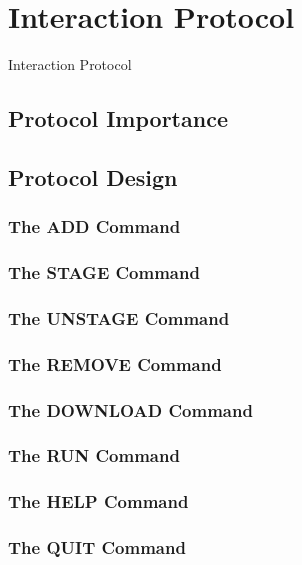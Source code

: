 \chapter{Interaction Protocol}
Interaction Protocol

  \section{Protocol Importance}

  \section{Protocol Design}
    \subsection{The ADD Command}
    \subsection{The STAGE Command}
    \subsection{The UNSTAGE Command}
    \subsection{The REMOVE Command}
    \subsection{The DOWNLOAD Command}
    \subsection{The RUN Command}
    \subsection{The HELP Command}
    \subsection{The QUIT Command}


